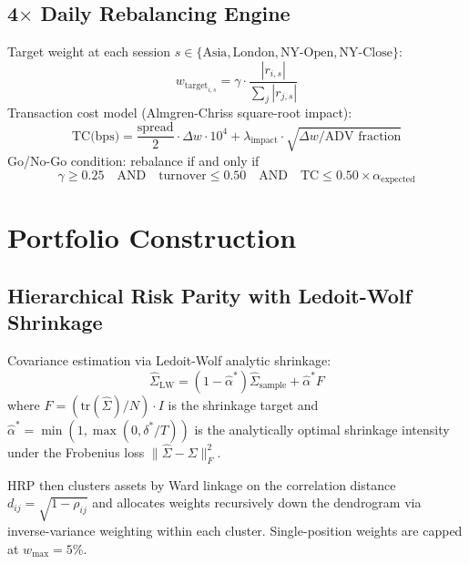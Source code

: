 \documentclass[11pt]{article}
\begin{document}
\subsection{4$\times$ Daily Rebalancing Engine}

Target weight at each session $s \in \{\text{Asia}, \text{London}, \text{NY-Open}, \text{NY-Close}\}$:
\begin{equation}
w_{\text{target}_{i,s}} = \gamma \cdot \frac{|r_{i,s}|}{\sum_j |r_{j,s}|}
\label{eq:target-weight}
\end{equation}
Transaction cost model (Almgren-Chriss square-root impact):
\begin{equation}
\text{TC(bps)} = \frac{\text{spread}}{2} \cdot \Delta w \cdot 10^4 + \lambda_{\text{impact}} \cdot \sqrt{\Delta w / \text{ADV fraction}}
\label{eq:tc-model}
\end{equation}
Go/No-Go condition: rebalance if and only if
\begin{equation}
\gamma \geq 0.25 \quad \text{AND} \quad \text{turnover} \leq 0.50 \quad \text{AND} \quad \text{TC} \leq 0.50 \times \alpha_{\text{expected}}
\label{eq:go-nogo}
\end{equation}

\section{Portfolio Construction}

\subsection{Hierarchical Risk Parity with Ledoit-Wolf Shrinkage}

Covariance estimation via Ledoit-Wolf analytic shrinkage:
\begin{equation}
\hat{\Sigma}_{\text{LW}} = (1-\hat{\alpha}^*)\hat{\Sigma}_{\text{sample}} + \hat{\alpha}^* F
\label{eq:lw-shrinkage}
\end{equation}
where $F = (\text{tr}(\hat{\Sigma})/N) \cdot I$ is the shrinkage target and $\hat{\alpha}^* = \min(1, \max(0, \delta^*/T))$ is the analytically optimal shrinkage intensity under the Frobenius loss $\|\hat{\Sigma} - \Sigma\|_F^2$.

HRP then clusters assets by Ward linkage on the correlation distance $d_{ij} = \sqrt{1-\rho_{ij}}$ and allocates weights recursively down the dendrogram via inverse-variance weighting within each cluster. Single-position weights are capped at $w_{\max} = 5\%$.
\end{document}
